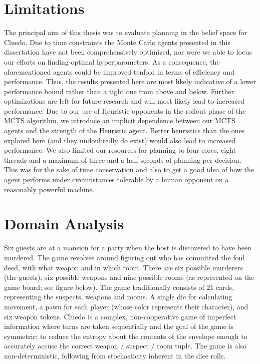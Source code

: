 \documentclass[msc, ai, logo, twoside, notimes, parskip, leftchapter, normalheadings]{infthesis}
\begin{document}
\section{Limitations}
The principal aim of this thesis was to evaluate planning in the belief space for Cluedo. Due to time constraints the Monte Carlo agents presented in this dissertation have not been comprehensively optimized, nor were we able to focus our efforts on finding optimal hyperparameters. As a consequence, the aforementioned agents could be improved tenfold in terms of efficiency and performance. Thus, the results presented here are most likely indicative of a lower performance bound rather than a tight one from above and below. Further optimizations are left for future research and will most likely lead to increased performance. Due to our use of Heuristic opponents in the rollout phase of the MCTS algorithm, we introduce an implicit dependence between our MCTS agents and the strength of the Heuristic agent. Better heuristics than the ones explored here (and they undoubtedly do exist) would also lead to increased performance. We also limited our resources for planning to four cores, eight threads and a maximum of three and a half seconds of planning per decision. This was for the sake of time conservation and also to get a good idea of how the agent performs under circumstances tolerable by a human opponent on a reasonably powerful machine. 

\section{Domain Analysis}
Six guests are at a mansion for a party when the host is discovered to have been murdered. The game revolves around figuring out who has committed the foul deed, with what weapon and in which room. There are six possible murderers (the guests), six possible weapons and nine possible rooms (as represented on the game board; see figure below). The game traditionally consists of 21 cards, representing the suspects, weapons and rooms. A single die for calculating movement, a pawn for each player (whose color represents their character), and six weapon tokens. Cluedo is a complex, non-cooperative game of imperfect information where turns are taken sequentially and the goal of the game is symmetric; to reduce the entropy about the contents of the envelope enough to accurately accuse the correct weapon / suspect / room tuple. The game is also non-deterministic, following from stochasticity inherent in the dice rolls.
\end{document}
